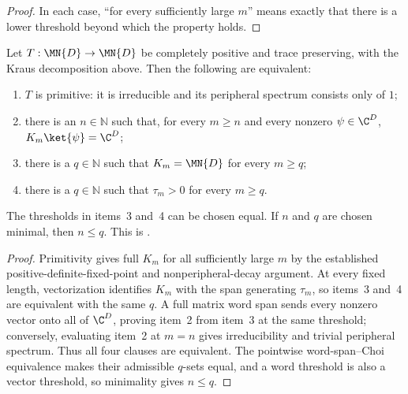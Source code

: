 \begin{proof}
    \leanok
    In each case, ``for every sufficiently large $m$'' means exactly that
    there is a lower threshold beyond which the property holds.
\end{proof}

\begin{theorem}
    \label{thm:wolf_6_8_kraus_equivalences}
    \leanok
    Let $T:\MN{D}\to\MN{D}$ be completely positive and trace preserving,
    with the Kraus decomposition above. Then the following are equivalent:
    \begin{enumerate}
        \item $T$ is primitive: it is irreducible and its peripheral spectrum
              consists only of $1$;
        \item there is an $n\in\mathbb N$ such that, for every $m\geq n$ and
              every nonzero $\psi\in\C^D$, $K_m\ket{\psi}=\C^D$;
        \item there is a $q\in\mathbb N$ such that
              $K_m=\MN{D}$ for every $m\geq q$;
        \item there is a $q\in\mathbb N$ such that
              $\tau_m>0$ for every $m\geq q$.
    \end{enumerate}
    The thresholds in items~3 and~4 can be chosen equal. If $n$ and $q$ are
    chosen minimal, then $n\leq q$. This is
    \cite[Theorem~6.8]{Wolf2012Quantum}.
\end{theorem}

\begin{proof}
    \leanok
    Primitivity gives full $K_m$ for all sufficiently large $m$ by the
    established positive-definite-fixed-point and nonperipheral-decay
    argument. At every fixed length, vectorization identifies $K_m$ with the
    span generating $\tau_m$, so items~3 and~4 are equivalent with the same
    $q$. A full matrix word span sends every nonzero vector onto all of
    $\C^D$, proving item~2 from item~3 at the same threshold;
    conversely, evaluating item~2 at $m=n$ gives irreducibility and trivial
    peripheral spectrum. Thus all four clauses are equivalent. The pointwise
    word-span--Choi equivalence makes their admissible $q$-sets equal, and a
    word threshold is also a vector threshold, so minimality gives $n\leq q$.
\end{proof}

